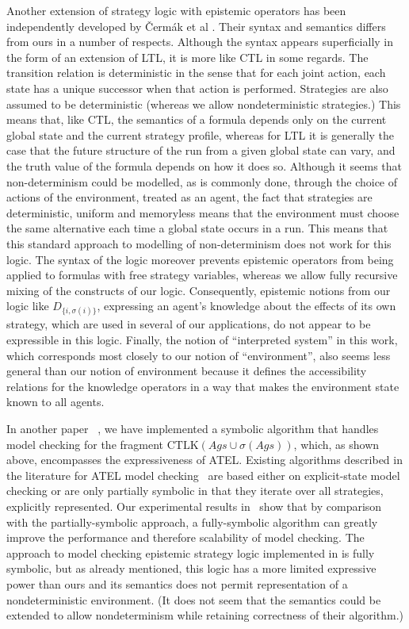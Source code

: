 \documentclass[a4wide]{article}
\newcommand{\CTLK}{\mbox{CTLK}}
\theoremstyle{examplesty}
\newcommand{\strat}{\sigma}
\newcommand{\Ags}{\mathit{Ags}}
\begin{document}
Another extension of strategy logic with epistemic operators has been 
independently developed by \v{C}erm\'{a}k et al \cite{CLMM2014,Cermak}. 
Their syntax and semantics differs from ours in a number of respects. 
Although the syntax appears superficially in the
form of an extension of LTL, it is more like CTL in some regards. 
The transition relation is deterministic in the 
sense that for each joint action, each state has a unique successor
when that action is performed. 
Strategies are also assumed to be deterministic (whereas we allow nondeterministic strategies.)  
This means that, like CTL, the semantics of a formula
depends only on the current global state and the current strategy profile, 
whereas for LTL it is generally the case that the future structure of the run from a given global state can vary, and 
the truth value of the formula depends on how it does so. 
Although it seems that non-determinism could be modelled, as is commonly done, through the choice of actions 
of the environment, treated as an agent, the fact that strategies are deterministic, uniform and 
memoryless means that the environment must choose the 
same alternative each time a global state occurs in a run. This means
that this standard approach to modelling of non-determinism does not work for this 
logic. The syntax of the logic moreover prevents epistemic operators
from being applied to formulas with free strategy variables, whereas we
allow fully recursive mixing of the constructs of our logic. 
Consequently, epistemic notions from our logic like $D_{\{i, \strat(i)\}}$,  expressing an agent's knowledge 
about the effects of its own strategy, which are used in 
several of our applications, do not appear to be expressible in this logic.  
Finally, the notion of ``interpreted system'' in this work, which corresponds
most closely to our notion of ``environment'', also seems less general than our notion of 
environment because it  defines the accessibility relations for the knowledge operators in a way that makes the 
environment state known to all agents. 

In another paper ~\cite{AAAI2014}, we have implemented a symbolic algorithm that handles model checking 
for the fragment $\CTLK(
\Ags 
\cup \strat(\Ags))$, which, as shown above, encompasses the expressiveness of ATEL. 
Existing algorithms described in the literature for ATEL model checking~\cite{MCMASATL2006,CSS2010,BPQR2013} 
are based either on  explicit-state model checking or are only partially symbolic in that they
iterate over all strategies, explicitly represented.  Our 
experimental results in~\cite{AAAI2014} show that by comparison with the partially-symbolic 
approach, a fully-symbolic algorithm can greatly improve the performance and therefore scalability of model checking. 
The approach to model checking epistemic strategy logic implemented in \cite{CLMM2014,Cermak} 
is fully symbolic, but as already mentioned, this logic has a more limited expressive
power than ours and its semantics does not permit representation of a nondeterministic environment. 
(It does not seem that the semantics could be extended to allow nondeterminism while retaining correctness
of their algorithm.) 
\end{document}
